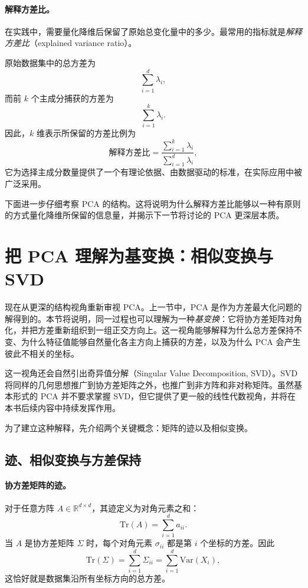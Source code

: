 \paragraph{解释方差比。}
在实践中，需要量化降维后保留了原始总变化量中的多少。最常用的指标就是\emph{解释方差比}（explained variance ratio）。

原始数据集中的总方差为
\[
\sum_{i=1}^d \lambda_i,
\]
而前 \(k\) 个主成分捕获的方差为
\[
\sum_{i=1}^k \lambda_i.
\]
因此，\(k\) 维表示所保留的方差比例为
\[
\text{解释方差比}
=
\frac{\sum_{i=1}^k \lambda_i}{\sum_{i=1}^d \lambda_i},
\]
它为选择主成分数量提供了一个有理论依据、由数据驱动的标准，在实际应用中被广泛采用。

下面进一步仔细考察 PCA 的结构。这将说明为什么解释方差比能够以一种有原则的方式量化降维所保留的信息量，并揭示下一节将讨论的 PCA 更深层本质。

\section{把 PCA 理解为基变换：相似变换与 SVD}
现在从更深的结构视角重新审视 PCA。上一节中，PCA 是作为方差最大化问题的解得到的。本节将说明，同一过程也可以理解为一种\emph{基变换}：它将协方差矩阵对角化，并把方差重新组织到一组正交方向上。这一视角能够解释为什么总方差保持不变、为什么特征值能够自然量化各主方向上捕获的方差，以及为什么 PCA 会产生彼此不相关的坐标。

这一视角还会自然引出奇异值分解（Singular Value Decomposition, SVD）。SVD 将同样的几何思想推广到协方差矩阵之外，也推广到非方阵和非对称矩阵。虽然基本形式的 PCA 并不要求掌握 SVD，但它提供了更一般的线性代数视角，并将在本书后续内容中持续发挥作用。

为了建立这种解释，先介绍两个关键概念：矩阵的迹以及相似变换。

\subsection{迹、相似变换与方差保持}

\paragraph{协方差矩阵的迹。}
对于任意方阵 \(A\in\mathbb{R}^{d\times d}\)，其迹定义为对角元素之和：
\[
\mathrm{Tr}(A)=\sum_{i=1}^d a_{ii}.
\]
当 \(A\) 是协方差矩阵 \(\Sigma\) 时，每个对角元素 \(\sigma_{ii}\) 都是第 \(i\) 个坐标的方差。因此
\[
\mathrm{Tr}(\Sigma)
=
\sum_{i=1}^d \Sigma_{ii}
=
\sum_{i=1}^d \mathrm{Var}(X_i),
\]
这恰好就是数据集沿所有坐标方向的总方差。

